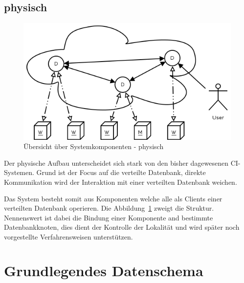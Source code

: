 \subsection{physisch}

\begin{figure}[ht] 
  \centering
  \label{fig:grob-layout-komponenten}
  \includegraphics[width=\textwidth]{imageinput/grob-layout-komponenten.png}
  \caption{\"Ubersicht \"uber Systemkomponenten - physisch}
\end{figure}

Der physische Aufbau unterscheidet sich stark von den bisher dagewesenen CI-Systemen.
Grund ist der Focus auf die verteilte Datenbank, direkte Kommunikation
wird der Interaktion mit einer verteilten Datenbank weichen.

Das System besteht somit aus Komponenten welche alle als Clients einer verteilten Datenbank operieren.
Die Abbildung~\ref{fig:grob-layout-komponenten} zweigt die Struktur.
Nennenswert ist dabei die Bindung einer Komponente and bestimmte Datenbankknoten,
dies dient der Kontrolle der Lokalit\"at und wird sp\"ater noch vorgestellte Verfahrensweisen unterst\"utzen.


\section{Grundlegendes Datenschema}


